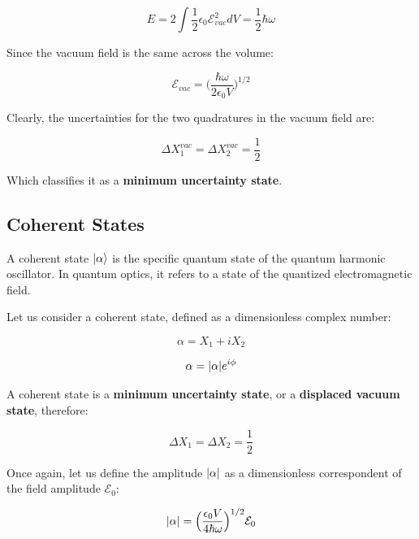 \documentclass[12pt,a4paper]{report}
\begin{document}
\begin{equation}
    E=2\int{\frac{1}{2}\epsilon_0\mathcal{E}^2_{vac}dV}=\frac{1}{2}\hbar\omega
\end{equation}

Since the vacuum field is the same across the volume:

\begin{equation}
    \mathcal{E}_{vac}=\Big(\frac{\hbar\omega}{2\epsilon_0V}\Big)^{1/2}
\end{equation}

Clearly, the uncertainties for the two quadratures in the vacuum field are:

\begin{equation}
    \Delta X_1^{vac}=\Delta X_2^{vac}=\frac{1}{2}
\end{equation}

Which classifies it as a \textbf{minimum uncertainty state}.

\subsection{Coherent States}

A coherent state $\ket{\alpha}$ is the specific quantum state of the quantum harmonic oscillator. In quantum optics, it refers to a state of the quantized electromagnetic field. 

Let us consider a coherent state, defined as a dimensionless complex number:

\begin{equation}
    \alpha=X_1+iX_2
\end{equation}

\begin{equation}
    \alpha=\abs{\alpha}e^{i\phi}
\end{equation}

A coherent state is a \textbf{minimum uncertainty state}, or a \textbf{displaced vacuum state}, therefore:

\begin{equation}
    \Delta X_1=\Delta X_2=\frac{1}{2}
\end{equation}


Once again, let us define the amplitude $\abs{\alpha}$ as a dimensionless correspondent of the field amplitude $\mathcal{E}_0$:

\begin{equation}
    \abs{\alpha}=\Big( \frac{\epsilon_0V}{4\hbar\omega} \Big)^{1/2}\mathcal{E}_0
\end{equation}
\end{document}
